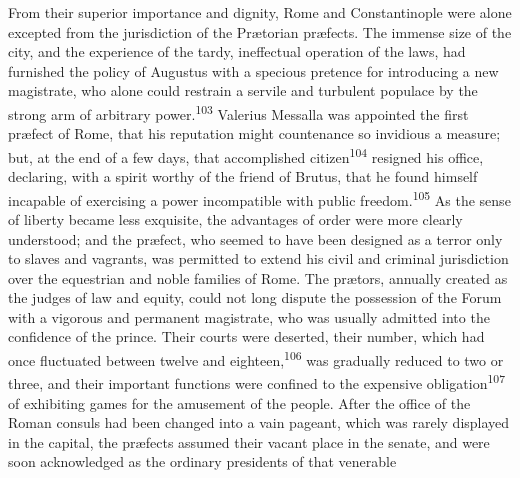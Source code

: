 

From their superior importance and dignity, Rome and
Constantinople were alone excepted from the jurisdiction of the
Prætorian præfects. The immense size of the city, and the
experience of the tardy, ineffectual operation of the laws, had
furnished the policy of Augustus with a specious pretence for
introducing a new magistrate, who alone could restrain a servile
and turbulent populace by the strong arm of arbitrary power.\textsuperscript{103}
Valerius Messalla was appointed the first præfect of Rome, that
his reputation might countenance so invidious a measure; but, at
the end of a few days, that accomplished citizen\textsuperscript{104} resigned his
office, declaring, with a spirit worthy of the friend of Brutus,
that he found himself incapable of exercising a power
incompatible with public freedom.\textsuperscript{105} As the sense of liberty
became less exquisite, the advantages of order were more clearly
understood; and the præfect, who seemed to have been designed as
a terror only to slaves and vagrants, was permitted to extend his
civil and criminal jurisdiction over the equestrian and noble
families of Rome. The prætors, annually created as the judges of
law and equity, could not long dispute the possession of the
Forum with a vigorous and permanent magistrate, who was usually
admitted into the confidence of the prince. Their courts were
deserted, their number, which had once fluctuated between twelve
and eighteen,\textsuperscript{106} was gradually reduced to two or three, and
their important functions were confined to the expensive
obligation\textsuperscript{107} of exhibiting games for the amusement of the
people. After the office of the Roman consuls had been changed
into a vain pageant, which was rarely displayed in the capital,
the præfects assumed their vacant place in the senate, and were
soon acknowledged as the ordinary presidents of that venerable
